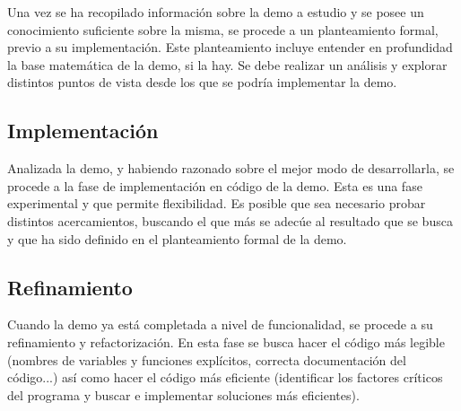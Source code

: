 Una vez se ha recopilado información sobre la demo a estudio y se posee un conocimiento suficiente sobre la misma, se procede a un planteamiento formal, previo a su implementación. Este planteamiento incluye entender en profundidad la base matemática de la demo, si la hay. Se debe realizar un análisis y explorar distintos puntos de vista desde los que se podría implementar la demo.

\subsection{Implementación}

Analizada la demo, y habiendo razonado sobre el mejor modo de desarrollarla, se procede a la fase de implementación en código de la demo. Esta es una fase experimental y que permite flexibilidad. Es posible que sea necesario probar distintos acercamientos, buscando el que más se adecúe al resultado que se busca y que ha sido definido en el planteamiento formal de la demo.

\subsection{Refinamiento}

Cuando la demo ya está completada a nivel de funcionalidad, se procede a su refinamiento y refactorización. En esta fase se busca hacer el código más legible (nombres de variables y funciones explícitos, correcta documentación del código...) así como hacer el código más eficiente (identificar los factores críticos del programa y buscar e implementar soluciones más eficientes).